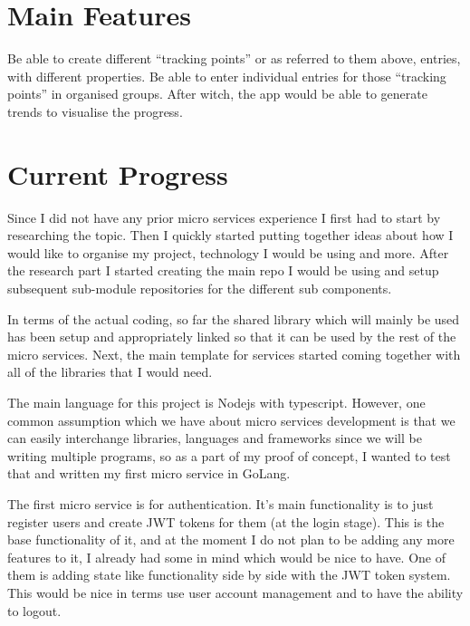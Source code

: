 \documentclass[11pt]{article}
\begin{document}
\section{Main Features}

Be able to create different ``tracking points'' or as referred to them above, entries, with different properties. Be able to enter individual entries for those ``tracking points'' in organised groups. After witch, the app would be able to generate trends to visualise the progress. \par

\section{Current Progress}

Since I did not have any prior micro services experience I first had to start by researching the topic. Then I quickly started putting together ideas about how I would like to organise my project, technology I would be using and more. After the research part I started creating the main repo I would be using and setup subsequent sub-module repositories for the different sub components. \par

In terms of the actual coding, so far the shared library which will mainly be used has been setup and appropriately linked so that it can be used by the rest of the micro services. Next, the main template for services started coming together with all of the libraries that I would need. \par

The main language for this project is Nodejs with typescript. However, one common assumption which we have about micro services development is that we can easily interchange libraries, languages and frameworks since we will be writing multiple programs, so as a part of my proof of concept, I wanted to test that and written my first micro service in GoLang. \par

The first micro service is for authentication. It's main functionality is to just register users and create JWT tokens for them (at the login stage). This is the base functionality of it, and at the moment I do not plan to be adding any more features to it, I already had some in mind which would be nice to have. One of them is adding state like functionality side by side with the JWT token system. This would be nice in terms use user account management and to have the ability to logout. \par
\end{document}
